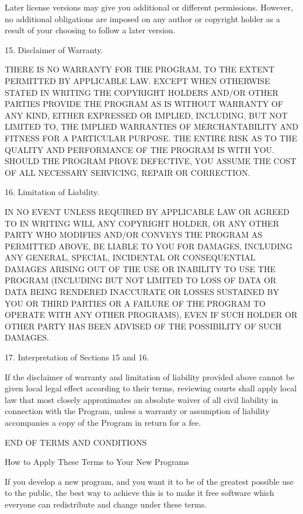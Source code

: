 \documentclass[a4paper,10pt,english]{sphinxmanual}
\begin{document}
\begin{sphinxVerbatim}[commandchars=\\\{\}]
  Later license versions may give you additional or different
permissions.  However, no additional obligations are imposed on any
author or copyright holder as a result of your choosing to follow a
later version.

  15. Disclaimer of Warranty.

  THERE IS NO WARRANTY FOR THE PROGRAM, TO THE EXTENT PERMITTED BY
APPLICABLE LAW.  EXCEPT WHEN OTHERWISE STATED IN WRITING THE COPYRIGHT
HOLDERS AND/OR OTHER PARTIES PROVIDE THE PROGRAM \PYGZdq{}AS IS\PYGZdq{} WITHOUT WARRANTY
OF ANY KIND, EITHER EXPRESSED OR IMPLIED, INCLUDING, BUT NOT LIMITED TO,
THE IMPLIED WARRANTIES OF MERCHANTABILITY AND FITNESS FOR A PARTICULAR
PURPOSE.  THE ENTIRE RISK AS TO THE QUALITY AND PERFORMANCE OF THE PROGRAM
IS WITH YOU.  SHOULD THE PROGRAM PROVE DEFECTIVE, YOU ASSUME THE COST OF
ALL NECESSARY SERVICING, REPAIR OR CORRECTION.

  16. Limitation of Liability.

  IN NO EVENT UNLESS REQUIRED BY APPLICABLE LAW OR AGREED TO IN WRITING
WILL ANY COPYRIGHT HOLDER, OR ANY OTHER PARTY WHO MODIFIES AND/OR CONVEYS
THE PROGRAM AS PERMITTED ABOVE, BE LIABLE TO YOU FOR DAMAGES, INCLUDING ANY
GENERAL, SPECIAL, INCIDENTAL OR CONSEQUENTIAL DAMAGES ARISING OUT OF THE
USE OR INABILITY TO USE THE PROGRAM (INCLUDING BUT NOT LIMITED TO LOSS OF
DATA OR DATA BEING RENDERED INACCURATE OR LOSSES SUSTAINED BY YOU OR THIRD
PARTIES OR A FAILURE OF THE PROGRAM TO OPERATE WITH ANY OTHER PROGRAMS),
EVEN IF SUCH HOLDER OR OTHER PARTY HAS BEEN ADVISED OF THE POSSIBILITY OF
SUCH DAMAGES.

  17. Interpretation of Sections 15 and 16.

  If the disclaimer of warranty and limitation of liability provided
above cannot be given local legal effect according to their terms,
reviewing courts shall apply local law that most closely approximates
an absolute waiver of all civil liability in connection with the
Program, unless a warranty or assumption of liability accompanies a
copy of the Program in return for a fee.

                     END OF TERMS AND CONDITIONS

            How to Apply These Terms to Your New Programs

  If you develop a new program, and you want it to be of the greatest
possible use to the public, the best way to achieve this is to make it
free software which everyone can redistribute and change under these terms.


\end{sphinxVerbatim}
\end{document}
